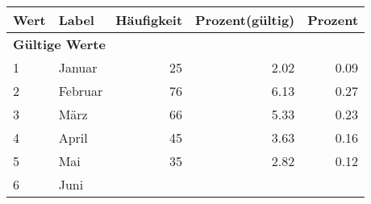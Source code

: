      \begin{longtable}{lXrrr}
     \toprule
     \textbf{Wert} & \textbf{Label} & \textbf{Häufigkeit} & \textbf{Prozent(gültig)} & \textbf{Prozent} \\
     \endhead
     \midrule
     \multicolumn{5}{l}{\textbf{Gültige Werte}}\\

     1 &
     \multicolumn{1}{X}{ Januar   } &


       \num{25} &
       \num[round-mode=places,round-precision=2]{2.02} &
         \num[round-mode=places,round-precision=2]{0.09} \\

     2 &
     \multicolumn{1}{X}{ Februar   } &


       \num{76} &
       \num[round-mode=places,round-precision=2]{6.13} &
         \num[round-mode=places,round-precision=2]{0.27} \\

     3 &
     \multicolumn{1}{X}{ März   } &


       \num{66} &
       \num[round-mode=places,round-precision=2]{5.33} &
         \num[round-mode=places,round-precision=2]{0.23} \\

     4 &
     \multicolumn{1}{X}{ April   } &


       \num{45} &
       \num[round-mode=places,round-precision=2]{3.63} &
         \num[round-mode=places,round-precision=2]{0.16} \\

     5 &
     \multicolumn{1}{X}{ Mai   } &


       \num{35} &
       \num[round-mode=places,round-precision=2]{2.82} &
         \num[round-mode=places,round-precision=2]{0.12} \\

     6 &
     \multicolumn{1}{X}{ Juni   } &



\end{longtable}
